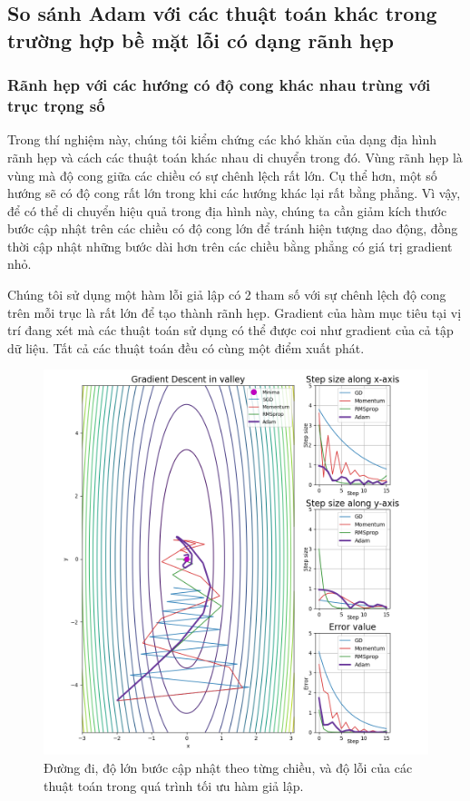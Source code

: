 \subsection{So sánh Adam với các thuật toán khác trong trường hợp bề mặt lỗi có dạng rãnh hẹp}

\subsubsection{Rãnh hẹp với các hướng có độ cong khác nhau trùng với trục trọng số}
\label{exp:step-size}

Trong thí nghiệm này, chúng tôi kiểm chứng các khó khăn của dạng địa hình rãnh hẹp và cách các thuật toán khác nhau di chuyển trong đó. Vùng rãnh hẹp là vùng mà độ cong giữa các chiều có sự chênh lệch rất lớn. Cụ thể hơn, một số hướng sẽ có độ cong rất lớn trong khi các hướng khác lại rất bằng phẳng. Vì vậy, để có thể di chuyển hiệu quả trong địa hình này, chúng ta cần giảm kích thước bước cập nhật trên các chiều có độ cong lớn để tránh hiện tượng dao động, đồng thời cập nhật những bước dài hơn trên các chiều bằng phẳng có giá trị gradient nhỏ.

Chúng tôi sử dụng một hàm lỗi giả lập có 2 tham số với sự chênh lệch độ cong trên mỗi trục là rất lớn để tạo thành rãnh hẹp. Gradient của hàm mục tiêu tại vị trí đang xét mà các thuật toán sử dụng có thể được coi như gradient của cả tập dữ liệu. Tất cả các thuật toán đều có cùng một điểm xuất phát.

\begin{figure}[htp]
	\centering
	\includegraphics[width=140 mm]{images/step-size.png}
	\caption{Đường đi, độ lớn bước cập nhật theo từng chiều, và độ lỗi của các thuật toán trong quá trình tối ưu hàm giả lập.}
	\label{fig:aligned-step-size}
\end{figure}

